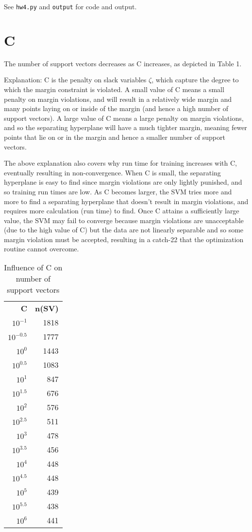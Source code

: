 \documentclass{article}
\begin{document}
See \texttt{hw4.py} and \texttt{output} for code and output.

\section*{C}

The number of support vectors decreases as C increases, as depicted in Table
1. 

Explanation: C is the penalty on slack variables $\zeta$, which capture the
degree to which the margin constraint is violated. A small value of C
means a small penalty on margin violations, and will result in a relatively wide margin 
and many points laying on or inside of the margin (and hence a high number of support vectors). 
A large value of C means a
large penalty on margin violations, and so the separating hyperplane will have a
much tighter margin, meaning fewer
points that lie on or in the margin and hence a smaller number of support
vectors. 

The above explanation also covers why run time for training increases with C,
eventually resulting in non-convergence.
When C is small, the separating
hyperplane is easy to find since margin violations are only
lightly punished, and so training run times are low. As C becomes larger, the
SVM tries more and more to find a separating hyperplane that doesn't result in
margin violations, and requires more calculation (run time) to find. 
Once C attains a sufficiently large value, the SVM may fail to converge because 
margin violations are unacceptable (due to the high value of C) but the data are 
not linearly separable and so some margin violation must be accepted, resulting
in a catch-22 that the optimization routine cannot overcome.

\begin{table}[h!]
	\caption{Influence of C on number of support vectors}
	\centering
	\begin{tabular}{|r r|}
		\hline
		\textbf{C} & \textbf{n(SV)} \\
		$10^{-1}$ & 1818 \\
		$10^{-0.5}$ & 1777 \\
		$10^{0}$ & 1443 \\
		$10^{0.5}$ & 1083 \\
		$10^{1}$ & 847 \\
		$10^{1.5}$ & 676 \\
		$10^{2}$ & 576 \\
		$10^{2.5}$ & 511 \\
		$10^{3}$ & 478 \\
		$10^{3.5}$ & 456 \\
		$10^{4}$ & 448 \\
		$10^{4.5}$ & 448 \\
		$10^{5}$ & 439 \\
		$10^{5.5}$ & 438 \\
		$10^{6}$ & 441 \\
		\hline
	\end{tabular}
\end{table}
\end{document}
